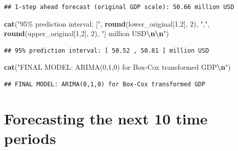 \documentclass[
]{article}
\newenvironment{Shaded}{\begin{snugshade}}{\end{snugshade}}
\newcommand{\DecValTok}[1]{\textcolor[rgb]{0.00,0.00,0.81}{#1}}
\newcommand{\FunctionTok}[1]{\textcolor[rgb]{0.13,0.29,0.53}{\textbf{#1}}}
\newcommand{\NormalTok}[1]{#1}
\newcommand{\SpecialCharTok}[1]{\textcolor[rgb]{0.81,0.36,0.00}{\textbf{#1}}}
\newcommand{\StringTok}[1]{\textcolor[rgb]{0.31,0.60,0.02}{#1}}
\begin{document}
\begin{verbatim}
## 1-step ahead forecast (original GDP scale): 50.66 million USD
\end{verbatim}

\begin{Shaded}
\begin{Highlighting}[]
\FunctionTok{cat}\NormalTok{(}\StringTok{"95\% prediction interval: ["}\NormalTok{, }\FunctionTok{round}\NormalTok{(lower\_original[}\DecValTok{1}\NormalTok{,}\DecValTok{2}\NormalTok{], }\DecValTok{2}\NormalTok{), }\StringTok{","}\NormalTok{, }
    \FunctionTok{round}\NormalTok{(upper\_original[}\DecValTok{1}\NormalTok{,}\DecValTok{2}\NormalTok{], }\DecValTok{2}\NormalTok{), }\StringTok{"] million USD}\SpecialCharTok{\textbackslash{}n\textbackslash{}n}\StringTok{"}\NormalTok{)}
\end{Highlighting}
\end{Shaded}

\begin{verbatim}
## 95% prediction interval: [ 50.52 , 50.81 ] million USD
\end{verbatim}

\begin{Shaded}
\begin{Highlighting}[]
\FunctionTok{cat}\NormalTok{(}\StringTok{"FINAL MODEL: ARIMA(0,1,0) for Box{-}Cox transformed GDP}\SpecialCharTok{\textbackslash{}n}\StringTok{"}\NormalTok{)}
\end{Highlighting}
\end{Shaded}

\begin{verbatim}
## FINAL MODEL: ARIMA(0,1,0) for Box-Cox transformed GDP
\end{verbatim}

\section{Forecasting the next 10 time
periods}\label{forecasting-the-next-10-time-periods}
\end{document}
